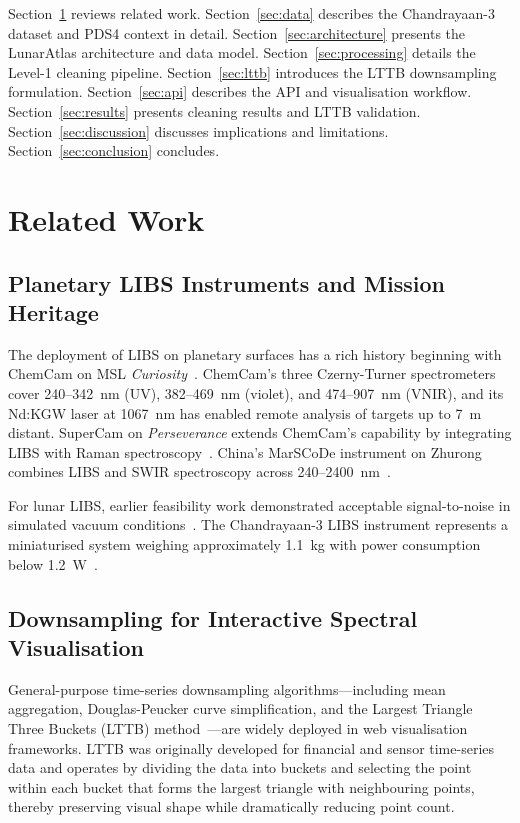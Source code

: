 \documentclass[a4paper,twocolumn,10pt]{article}
\begin{document}
Section~\ref{sec:related} reviews related work.
Section~\ref{sec:data} describes the Chandrayaan-3 dataset and PDS4
context in detail.  Section~\ref{sec:architecture} presents the
LunarAtlas architecture and data model.
Section~\ref{sec:processing} details the Level-1 cleaning pipeline.
Section~\ref{sec:lttb} introduces the LTTB downsampling formulation.
Section~\ref{sec:api} describes the API and visualisation workflow.
Section~\ref{sec:results} presents cleaning results and LTTB validation.
Section~\ref{sec:discussion} discusses implications and limitations.
Section~\ref{sec:conclusion} concludes.


\section{Related Work}
\label{sec:related}

\subsection{Planetary LIBS Instruments and Mission Heritage}

The deployment of LIBS on planetary surfaces has a rich history
beginning with ChemCam on MSL \emph{Curiosity}~\cite{Wiens2012,
Maurice2012}.  ChemCam's three Czerny-Turner spectrometers cover
240--342~nm (UV), 382--469~nm (violet), and 474--907~nm (VNIR), and
its Nd:KGW laser at 1067~nm has enabled remote analysis of targets up
to 7~m distant.  SuperCam on \emph{Perseverance} extends ChemCam's
capability by integrating LIBS with Raman spectroscopy~\cite{Wiens2020}.
China's MarSCoDe instrument on Zhurong combines LIBS and SWIR
spectroscopy across 240--2400~nm~\cite{Xu2021,Zhao2023}.

For lunar LIBS, earlier feasibility work demonstrated acceptable
signal-to-noise in simulated vacuum conditions~\cite{Knight2000,
Lasue2012}.  The Chandrayaan-3 LIBS instrument represents a miniaturised
system weighing approximately 1.1~kg with power consumption below
1.2~W~\cite{Laxmiprasad2020}.

\subsection{Downsampling for Interactive Spectral Visualisation}

General-purpose time-series downsampling algorithms---including mean
aggregation, Douglas-Peucker curve simplification, and the Largest
Triangle Three Buckets (LTTB) method~\cite{Steinarsson2013}---are
widely deployed in web visualisation frameworks.  LTTB was originally
developed for financial and sensor time-series data and operates by
dividing the data into buckets and selecting the point within each
bucket that forms the largest triangle with neighbouring points,
thereby preserving visual shape while dramatically reducing point count.
\end{document}
